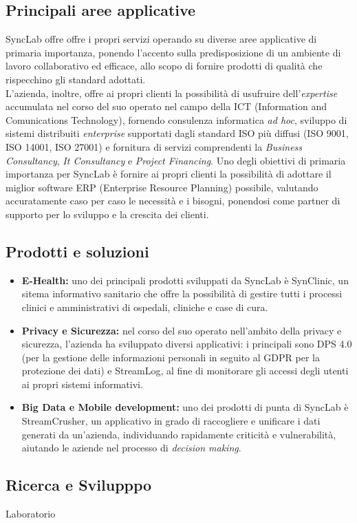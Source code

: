 \subsection{Principali aree applicative}
SyncLab offre offre i propri servizi operando su diverse aree applicative di primaria importanza, ponendo l'accento sulla predisposizione di un ambiente di lavoro collaborativo ed efficace, allo scopo di fornire prodotti di qualità che rispecchino gli standard adottati.\\
L'azienda, inoltre, offre ai propri clienti la possibilità di usufruire dell'\textit{expertise} accumulata nel corso del suo operato nel campo della \gls{ICT} (Information and Comunications Technology), fornendo consulenza informatica \textit{ad hoc}, sviluppo di sistemi distribuiti \textit{enterprise} supportati dagli standard ISO più diffusi (ISO 9001, ISO 14001, ISO 27001) e fornitura di servizi comprendenti la \textit{Business Consultancy}, \textit{It Consultancy} e \textit{Project Financing}.
Uno degli obiettivi di primaria importanza per SyncLab è fornire ai propri clienti la possibilità di adottare il miglior software \gls{ERP} (Enterprise Resource Planning) possibile, valutando accuratamente caso per caso le necessità e i bisogni, ponendosi come partner di supporto per lo sviluppo e la crescita dei clienti.\\


\subsection{Prodotti e soluzioni}
\begin{itemize}
	\item \textbf{E-Health:} uno  dei principali prodotti sviluppati da SyncLab è SynClinic, un sitema informativo sanitario che offre la possibilità di gestire tutti i processi clinici e amministrativi di ospedali, cliniche e case di cura.
	\item \textbf{Privacy e Sicurezza:} nel corso del suo operato nell'ambito della privacy e sicurezza, l'azienda ha sviluppato diversi applicativi: i principali sono DPS 4.0 (per la gestione delle informazioni personali in seguito al GDPR per la protezione dei dati) e StreamLog, al fine di monitorare gli accessi degli utenti ai propri sistemi informativi.
	\item \textbf{Big Data e Mobile development:} uno dei prodotti di punta di SyncLab è StreamCrusher, un applicativo in grado di raccogliere e unificare i dati generati da un'azienda, individuando rapidamente criticità e vulnerabilità, aiutando le aziende nel processo di \textit{decision making}.
\end{itemize}

\subsection{Ricerca e Svilupppo}
Laboratorio
